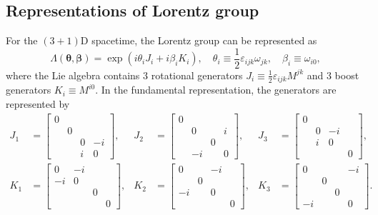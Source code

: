 \documentclass[aps,prb,superscriptaddress,nofootinbib]{revtex4}
\begin{document}
\subsection{Representations of Lorentz group}
For the $(3+1)$D spacetime, the Lorentz group can be represented as 
\begin{equation}\label{eq:lorentz-parameter}
	\Lambda(\bm \theta,\bm \beta) = \exp\left(i \theta_i J_i +i\beta_i K_i\right), \quad
	\theta_i \equiv \frac{1}{2}\varepsilon_{ijk}\omega_{jk},\quad
	\beta_i \equiv \omega_{i0},
\end{equation}
where the Lie algebra contains 3 rotational generators $J_i \equiv \frac{1}{2}\varepsilon_{ijk}M^{jk}$ and 3 boost generators $K_i \equiv M^{i0}$. 
In the fundamental representation, the generators are represented by
\begin{equation*}
\begin{aligned}
	J_1 &= \left[\begin{array}{cccc} 0 & & & \\ & 0 & & \\ & & 0 & -i \\ & & i & 0 \end{array}\right], & 
	J_2 &= \left[\begin{array}{cccc} 0 & & & \\ & 0 & & i \\ & & 0 & \\ & -i & & 0 \end{array}\right], &
	J_3 &= \left[\begin{array}{cccc} 0 & & & \\ & 0 & -i & \\ & i & 0 & \\ & & & 0 \end{array}\right], \\
	K_1 &= \left[\begin{array}{cccc} 0 & -i & & \\ -i & 0 & & \\ & & 0 & \\ & & & 0 \end{array}\right], & 
	K_2 &= \left[\begin{array}{cccc} 0 & & -i & \\ & 0 & & \\ -i & & 0 & \\ & & & 0 \end{array}\right], &
	K_3 &= \left[\begin{array}{cccc} 0 & & & -i \\ & 0 & & \\ & & 0 & \\ -i & & & 0 \end{array}\right].
\end{aligned}
\end{equation*}
\end{document}
